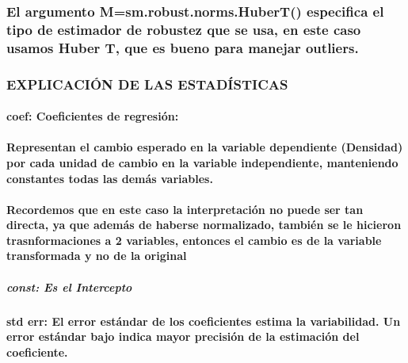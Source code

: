 \documentclass[11pt]{article}
\begin{document}
\subsubsection{El argumento M=sm.robust.norms.HuberT() especifica el
tipo de estimador de robustez que se usa, en este caso usamos Huber T,
que es bueno para manejar
outliers.}\label{el-argumento-msm.robust.norms.hubert-especifica-el-tipo-de-estimador-de-robustez-que-se-usa-en-este-caso-usamos-huber-t-que-es-bueno-para-manejar-outliers.}

    \subsubsection{EXPLICACIÓN DE LAS
ESTADÍSTICAS}\label{explicaciuxf3n-de-las-estaduxedsticas}

    \paragraph{coef: Coeficientes de
regresión:}\label{coef-coeficientes-de-regresiuxf3n}

\paragraph{Representan el cambio esperado en la variable dependiente
(Densidad) por cada unidad de cambio en la variable independiente,
manteniendo constantes todas las demás
variables.}\label{representan-el-cambio-esperado-en-la-variable-dependiente-densidad-por-cada-unidad-de-cambio-en-la-variable-independiente-manteniendo-constantes-todas-las-demuxe1s-variables.}

\paragraph{Recordemos que en este caso la interpretación no puede ser
tan directa, ya que además de haberse normalizado, también se le
hicieron trasnformaciones a 2 variables, entonces el cambio es de la
variable transformada y no de la
original}\label{recordemos-que-en-este-caso-la-interpretaciuxf3n-no-puede-ser-tan-directa-ya-que-ademuxe1s-de-haberse-normalizado-tambiuxe9n-se-le-hicieron-trasnformaciones-a-2-variables-entonces-el-cambio-es-de-la-variable-transformada-y-no-de-la-original}

    \subparagraph{const: Es el Intercepto}\label{const-es-el-intercepto}

    \paragraph{std err: El error estándar de los coeficientes estima la
variabilidad. Un error estándar bajo indica mayor precisión de la
estimación del
coeficiente.}\label{std-err-el-error-estuxe1ndar-de-los-coeficientes-estima-la-variabilidad.-un-error-estuxe1ndar-bajo-indica-mayor-precisiuxf3n-de-la-estimaciuxf3n-del-coeficiente.}
\end{document}
